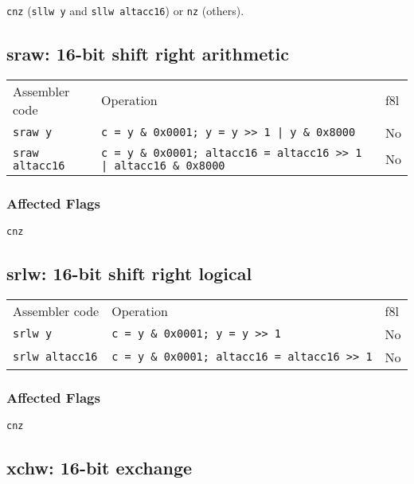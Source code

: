 \documentclass{book}
\begin{document}
\texttt{cnz} (\texttt{sllw y} and \texttt{sllw altacc16}) or \texttt{nz} (others).


\subsection{sraw: 16-bit shift right arithmetic}

\begin{tabular}{l l l}
Assembler code         & Operation                                                               & f8l \\
\texttt{sraw y}        & \texttt{c = y \& 0x0001; y = y >> 1 | y \& 0x8000}                      & No \\
\texttt{sraw altacc16} & \texttt{c = y \& 0x0001; altacc16 = altacc16 >> 1 | altacc16 \& 0x8000} & No \\
\end{tabular}

\subsubsection*{Affected Flags}

\texttt{cnz}

\subsection{srlw: 16-bit shift right logical}

\begin{tabular}{l l l}
Assembler code         & Operation                                          & f8l \\
\texttt{srlw y}        & \texttt{c = y \& 0x0001; y = y >> 1}               & No \\
\texttt{srlw altacc16} & \texttt{c = y \& 0x0001; altacc16 = altacc16 >> 1} & No \\
\end{tabular}

\subsubsection*{Affected Flags}

\texttt{cnz}


\subsection{xchw: 16-bit exchange}
\end{document}
